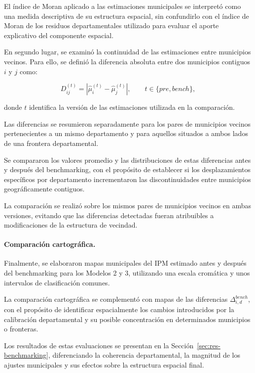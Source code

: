 El índice de Moran aplicado a las estimaciones municipales se interpretó como una medida descriptiva de su estructura espacial, sin confundirlo con el índice de Moran de los residuos departamentales utilizado para evaluar el aporte explicativo del componente espacial.

En segundo lugar, se examinó la continuidad de las estimaciones entre municipios vecinos. Para ello, se definió la diferencia absoluta entre dos municipios contiguos $i$ y $j$ como:

\begin{equation}
D_{ij}^{(t)}
=
\left|
\widehat{\mu}_{i}^{(t)}
-
\widehat{\mu}_{j}^{(t)}
\right|,
\qquad
t\in\{pre,bench\},
\label{eq:met-frontera-benchmark}
\end{equation}

donde $t$ identifica la versión de las estimaciones utilizada en la comparación.

Las diferencias se resumieron separadamente para los pares de municipios vecinos pertenecientes a un mismo departamento y para aquellos situados a ambos lados de una frontera departamental.

Se compararon los valores promedio y las distribuciones de estas diferencias antes y después del benchmarking, con el propósito de establecer si los desplazamientos específicos por departamento incrementaron las discontinuidades entre municipios geográficamente contiguos.

La comparación se realizó sobre los mismos pares de municipios vecinos en ambas versiones, evitando que las diferencias detectadas fueran atribuibles a modificaciones de la estructura de vecindad.

\paragraph{Comparación cartográfica.}

Finalmente, se elaboraron mapas municipales del IPM estimado antes y después del benchmarking para los Modelos 2 y 3, utilizando una escala cromática y unos intervalos de clasificación comunes.

La comparación cartográfica se complementó con mapas de las diferencias $\Delta_{i,d}^{bench}$, con el propósito de identificar espacialmente los cambios introducidos por la calibración departamental y su posible concentración en determinados municipios o fronteras.

Los resultados de estas evaluaciones se presentan en la Sección~\ref{sec:res-benchmarking}, diferenciando la coherencia departamental, la magnitud de los ajustes municipales y sus efectos sobre la estructura espacial final.

